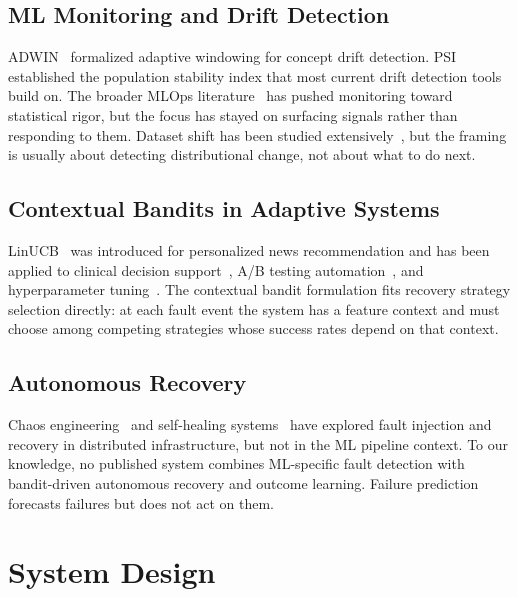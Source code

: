 \documentclass[conference]{IEEEtran}
\begin{document}
\subsection{ML Monitoring and Drift Detection}

ADWIN~\cite{adwin} formalized adaptive windowing for concept drift detection.
PSI~\cite{psi} established the population stability index that most current
drift detection tools build on. The broader MLOps literature~\cite{lwakatare,sculley}
has pushed monitoring toward statistical rigor, but the focus has stayed on
surfacing signals rather than responding to them. Dataset shift has been
studied extensively~\cite{datasetshift,calibration}, but the framing is
usually about detecting distributional change, not about what to do next.

\subsection{Contextual Bandits in Adaptive Systems}

LinUCB~\cite{linucb} was introduced for personalized news recommendation and
has been applied to clinical decision support~\cite{clinicalbandit}, A/B
testing automation~\cite{abtesting}, and hyperparameter tuning~\cite{hyperband}.
The contextual bandit formulation fits recovery strategy selection directly:
at each fault event the system has a feature context and must choose among
competing strategies whose success rates depend on that context.

\subsection{Autonomous Recovery}

Chaos engineering~\cite{chaos} and self-healing systems~\cite{selfhealing}
have explored fault injection and recovery in distributed infrastructure, but
not in the ML pipeline context. To our knowledge, no published system combines
ML-specific fault detection with bandit-driven autonomous recovery and outcome
learning. Failure prediction~\cite{failepredict} forecasts failures but does
not act on them.

\section{System Design}
\end{document}
